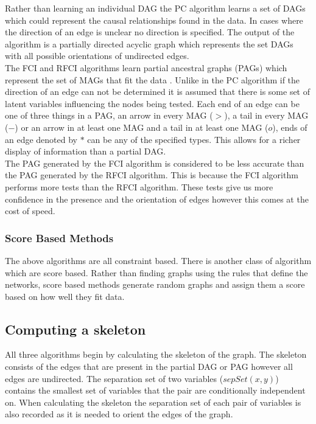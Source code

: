 \documentclass{article}
\begin{document}
Rather than learning an individual DAG the PC algorithm learns a set of DAGs which could represent the causal relationships found in the data. In cases where the direction of an edge is unclear no direction is specified. The output of the algorithm is a partially directed acyclic graph which represents the set DAGs with all possible orientations of undirected edges\cite{spirtes1991algorithm}.
\\

The FCI and RFCI algorithms learn partial ancestral graphs (PAGs) which represent the set of MAGs that fit the data \cite{colombo2012learning}. Unlike in the PC algorithm if the direction of an edge can not be determined it is assumed that there is some set of latent variables influencing the nodes being tested. Each end of an edge can be one of three things in a PAG, an arrow in every MAG ($>$), a tail in every MAG ($-$) or an arrow in at least one MAG and a tail in at least one MAG ($o$), ends of an edge denoted by $*$ can be any of the specified types. This allows for a richer display of information than a partial DAG\cite{colombo2012learning}.
\\

The PAG generated by the FCI algorithm is considered to be less accurate than the PAG generated by the RFCI algorithm. This is because the FCI algorithm performs more tests than the RFCI algorithm. These tests give us more confidence in the presence and the orientation of edges however this comes at the cost of speed.
\\
\subsubsection{Score Based Methods}
The above algorithms are all constraint based. There is another class of algorithm which are score based. Rather than finding graphs using the rules that define the networks, score based methods generate random graphs and assign them a score based on how well they fit data.\\

   
\subsection{Computing a skeleton}
All three algorithms begin by calculating the skeleton of the graph. The skeleton consists of the edges that are present in the partial DAG or PAG however all edges are undirected. The separation set of two variables ($sepSet(x,y)$) contains the smallest set of variables that the pair are conditionally independent on.  When calculating the skeleton the separation set of each pair of variables is also recorded as it is needed to orient the edges of the graph\cite{colombo2012learning, spirtes1991algorithm}.
\\
\end{document}
